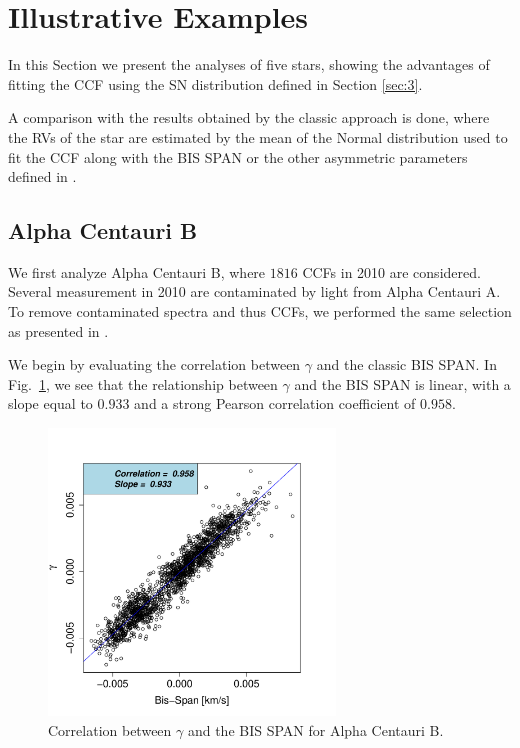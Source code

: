 \documentclass[11pt, oneside]{article}
\begin{document}
\section{Illustrative Examples} \label{sec:4}

In this Section we present the analyses of five stars, showing the advantages of fitting the CCF using the SN distribution defined in Section \ref{sec:3}. 

A comparison with the results obtained by the classic approach is done, where the RVs of the star are estimated by the mean of the Normal distribution used to fit the CCF along with the BIS SPAN or the other asymmetric parameters defined in \citet{Figueira-2013}.

\subsection{Alpha Centauri B} \label{sec:alphacentb}

We first analyze Alpha Centauri B, where $1816$ CCFs in 2010 are considered. Several measurement in 2010 are contaminated by light from Alpha Centauri A. To remove contaminated spectra and thus CCFs, we performed the same selection as presented in \citet{Dumusque-2012}.

We begin by evaluating the correlation between $\gamma$ and the classic BIS SPAN. In Fig.~\ref{fig:alphacent:corr.gamma}, we see that the relationship between $\gamma$ and the BIS SPAN is linear, with a slope equal to $0.933$ and a strong Pearson correlation coefficient of $0.958$. 
%
\begin{figure}[htbp]
   \centering
\includegraphics[height = 3in]{HD12862_[2]gamma_vs_bisspan.pdf} 
   \caption{Correlation between $\gamma$ and the BIS SPAN for Alpha Centauri B.}
   \label{fig:alphacent:corr.gamma}
\end{figure}
\end{document}
